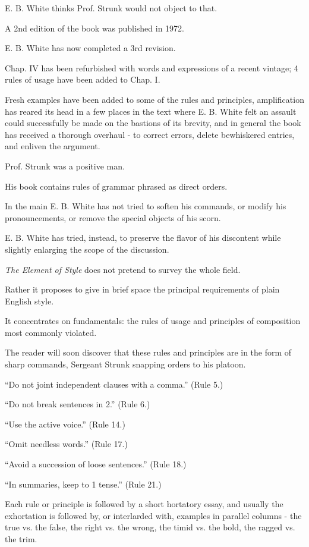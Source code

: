 \documentclass{book}
\numberwithin{equation}{section}
\begin{document}
E. B. White thinks Prof. Strunk would not object to that.

%
A 2nd edition of the book was published in 1972.

E. B. White has now completed a 3rd revision.

Chap. IV has been refurbished with words and expressions of a recent vintage; 4 rules of usage have been added to Chap. I.

Fresh examples have been added to some of the rules and principles, amplification has reared its head in a few places in the text where E. B. White felt an assault could successfully be made on the bastions of its brevity, and in general the book has received a thorough overhaul - to correct errors, delete bewhiskered entries, and enliven the argument.

%
Prof. Strunk was a positive man.

His book contains rules of grammar phrased as direct orders.

In the main E. B. White has not tried to soften his commands, or modify his pronouncements, or remove the special objects of his scorn.

E. B. White has tried, instead, to preserve the flavor of his discontent while slightly enlarging the scope of the discussion.

\textit{The Element of Style} does not pretend to survey the whole field.

Rather it proposes to give in brief space the principal requirements of plain English style.

It concentrates on fundamentals: the rules of usage and principles of composition most commonly violated.

%
The reader will soon discover that these rules and principles are in the form of sharp commands, Sergeant Strunk snapping orders to his platoon.

``Do not joint independent clauses with a comma.'' (Rule 5.)

``Do not break sentences in 2.'' (Rule 6.)

``Use the active voice.'' (Rule 14.)

``Omit needless words.'' (Rule 17.)

``Avoid a succession of loose sentences.'' (Rule 18.)

``In summaries, keep to 1 tense.'' (Rule 21.)

Each rule or principle is followed by a short hortatory essay, and usually the exhortation is followed by, or interlarded with, examples in parallel columns - the true vs. the false, the right vs. the wrong, the timid vs. the bold, the ragged vs. the trim.
\end{document}
